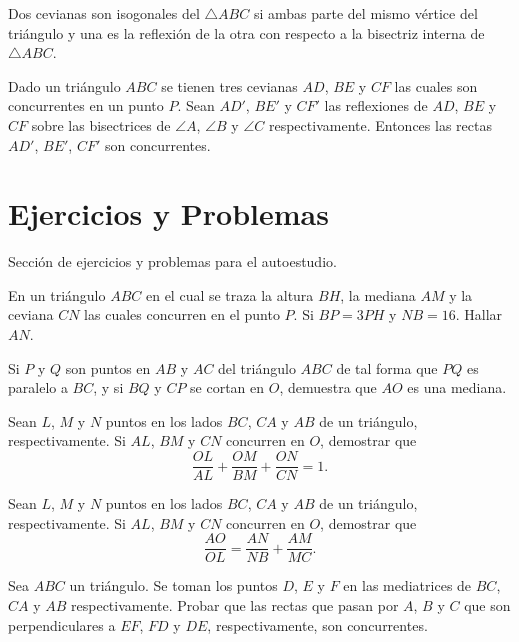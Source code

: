 \begin{section-definition.tcb}
    Dos cevianas son isogonales del $\triangle ABC$ si ambas parte del mismo vértice del triángulo y una es la reflexión de la otra con respecto a la bisectriz interna de $\triangle ABC$.
\end{section-definition.tcb}

\begin{section-definition.tcb}
    Dado un triángulo $ABC$ se tienen tres cevianas $AD$, $BE$ y $CF$ las cuales son concurrentes en un punto $P$.
    Sean $AD'$, $BE'$ y $CF'$ las reflexiones de $AD$, $BE$ y $CF$ sobre las bisectrices de $\angle A$, $\angle B$ y $\angle C$ respectivamente.
    Entonces las rectas $AD'$, $BE'$, $CF'$ son concurrentes.
\end{section-definition.tcb}



\section{Ejercicios y Problemas}
Sección de ejercicios y problemas para el autoestudio.

\begin{section-exercise}
    En un triángulo $ABC$ en el cual se traza la altura $BH$, la mediana $AM$ y la ceviana $CN$ las cuales concurren en el punto $P$.
    Si $BP = 3PH$ y $NB = 16$.
    Hallar $AN$.
\end{section-exercise}

\begin{section-exercise}
    Si $P$ y $Q$ son puntos en $AB$ y $AC$ del triángulo $ABC$ de tal forma que $PQ$ es paralelo a $BC$, y si $BQ$ y $CP$ se cortan en $O$, demuestra que $AO$ es una mediana.
\end{section-exercise}

\begin{section-exercise}
    Sean $L$, $M$ y $N$ puntos en los lados $BC$, $CA$ y $AB$ de un triángulo, respectivamente.
    Si $AL$, $BM$ y $CN$ concurren en $O$, demostrar que
    \[\frac{OL}{AL} + \frac{OM}{BM} + \frac{ON}{CN} = 1.\]
\end{section-exercise}

\begin{section-exercise}
    Sean $L$, $M$ y $N$ puntos en los lados $BC$, $CA$ y $AB$ de un triángulo, respectivamente.
    Si $AL$, $BM$ y $CN$ concurren en $O$, demostrar que
    \[\frac{AO}{OL} = \frac{AN}{NB} + \frac{AM}{MC}.\]
\end{section-exercise}

\begin{section-problem}
    Sea $ABC$ un triángulo.
    Se toman los puntos $D$, $E$ y $F$ en las mediatrices de $BC$, $CA$ y $AB$ respectivamente.
    Probar que las rectas que pasan por $A$, $B$ y $C$ que son perpendiculares a $EF$, $FD$ y $DE$, respectivamente, son concurrentes.
\end{section-problem}
